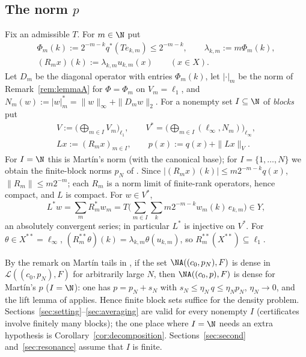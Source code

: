\subsection{The norm $p$}
Fix an admissible $T$.  For $m\in\N$ put
\begin{gather*}
 \Phi_m(k):=2^{-m-k}q^*(Te_{k,m})\le 2^{-m-k},\qquad
 \lambda_{k,m}:=m\Phi_m(k),\\
 (R_mx)(k):=\lambda_{k,m}u_{k,m}(x)\qquad(x\in X).
\end{gather*}
Let $D_m$ be the diagonal operator with entries $\Phi_m(k)$, let
$|\cdot|_m$ be the norm of Remark~\ref{rem:lemmaA} for $\Phi=\Phi_m$ on
$V_m=\ell_1$, and $N_m(w):=|w|_m^*=\|w\|_\infty+\|D_mw\|_2$.  For a nonempty
set $I\subseteq\N$ of \emph{blocks} put
\begin{gather*}
 V:=\Big(\bigoplus_{m\in I}V_m\Big)_{\ell_1},\qquad
 V^*=\Big(\bigoplus_{m\in I}(\ell_\infty,N_m)\Big)_{\ell_\infty},\\
 Lx:=(R_mx)_{m\in I},\qquad p(x):=q(x)+\|Lx\|_V .
\end{gather*}
For $I=\N$ this is Mart\'in's norm (with the canonical base); for
$I=\{1,\dots,N\}$ we obtain the finite-block norms $p_N$ of \cite{PrB}.
Since $|(R_mx)(k)|\le m2^{-m-k}q(x)$, $\|R_m\|\leq m2^{-m}$; each $R_m$ is a
norm limit of finite-rank operators, hence compact, and $L$ is compact.
For $w\in V^*$,
\begin{equation}\label{eq:Lstar}
 L^*w=\sum_mR_m^*w_m=T\Big(\sum_{m\in I}\sum_k m2^{-m-k}w_m(k)\,e_{k,m}\Big)\in Y,
\end{equation}
an absolutely convergent series; in particular $L^*$ is injective on
$V^*$.  For $\theta\in X^{**}=\ell_\infty$,
$(R_m^{**}\theta)(k)=\lambda_{k,m}\theta(u_{k,m})$, so
$R_m^{**}(X^{**})\subseteq\ell_1$.

\begin{remark}\label{rem:blocks}
By the remark on Mart\'in tails in \cite{PrB}, if the set
$\NA((c_0,p_N),F)$ is dense in $\mathcal L((c_0,p_N),F)$ for arbitrarily
large $N$, then
$\NA((c_0,p),F)$ is dense for Mart\'in's $p$ ($I=\N$): one has
$p=p_N+s_N$ with $s_N\le\eta_N\,q\le\eta_Np_N$, $\eta_N\to0$, and the
lift lemma of \cite{PrB} applies.  Hence finite block sets suffice for the
density problem.  Sections~\ref{sec:setting}--\ref{sec:averaging} are
valid for every nonempty $I$ (certificates involve finitely many blocks);
the one place where $I=\N$ needs an extra hypothesis is
Corollary~\ref{cor:decomposition}.  Sections~\ref{sec:second}
and~\ref{sec:resonance} assume that $I$ is finite.
\end{remark}

